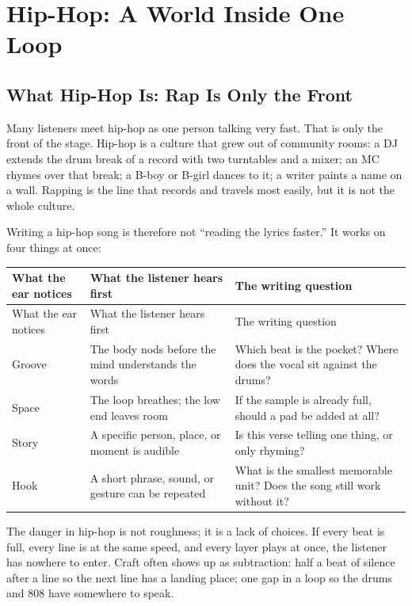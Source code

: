 \chapter{Hip-Hop: A World Inside One Loop}
\label{ch:genre-hiphop-deep}


\section{What Hip-Hop Is: Rap Is Only the Front}
\label{sec:hiphop-what}

Many listeners meet hip-hop as one person talking very fast. That is only the front of the stage. Hip-hop is a culture that grew out of community rooms: a DJ extends the drum break of a record with two turntables and a mixer; an MC rhymes over that break; a B-boy or B-girl dances to it; a writer paints a name on a wall. Rapping is the line that records and travels most easily, but it is not the whole culture.

Writing a hip-hop song is therefore not ``reading the lyrics faster.'' It works on four things at once:

\begin{longtable}{p{}p{}p{}}
\toprule
What the ear notices & What the listener hears first & The writing question \\
\midrule
\endfirsthead
\toprule
What the ear notices & What the listener hears first & The writing question \\
\midrule
\endhead
Groove & The body nods before the mind understands the words & Which beat is the pocket? Where does the vocal sit against the drums? \\
Space & The loop breathes; the low end leaves room & If the sample is already full, should a pad be added at all? \\
Story & A specific person, place, or moment is audible & Is this verse telling one thing, or only rhyming? \\
Hook & A short phrase, sound, or gesture can be repeated & What is the smallest memorable unit? Does the song still work without it? \\
\bottomrule
\end{longtable}

The danger in hip-hop is not roughness; it is a lack of choices. If every beat is full, every line is at the same speed, and every layer plays at once, the listener has nowhere to enter. Craft often shows up as subtraction: half a beat of silence after a line so the next line has a landing place; one gap in a loop so the drums and 808 have somewhere to speak.

